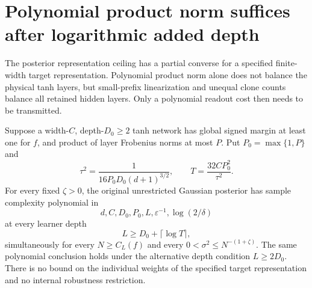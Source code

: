 \section{Polynomial product norm suffices after logarithmic added depth}
\label{sec:product-targets}

The posterior representation ceiling has a partial converse for a
specified finite-width target representation. Polynomial product norm
alone does not balance the physical tanh layers, but small-prefix
linearization and unequal clone counts balance all retained hidden
layers. Only a polynomial readout cost then needs to be transmitted.

\begin{theorem}
\label{thm:product-target-log-padding}
Suppose a width-$C$, depth-$D_0\ge2$ tanh network has global signed
margin at least one for $f$, and product of layer Frobenius norms at
most $P$. Put $P_0=\max\{1,P\}$ and
\[
 \tau^2=\frac1{16P_0D_0(d+1)^{3/2}},\qquad
 T=\frac{32CP_0^2}{\tau^2}.
\]
For every fixed $\zeta>0$, the original unrestricted Gaussian posterior
has sample complexity polynomial in
\[
 d,C,D_0,P_0,L,\varepsilon^{-1},\log(2/\delta)
\]
at every learner depth
\[
 L\ge D_0+\lceil\log T\rceil,
\]
simultaneously for every $N\ge C_L(f)$ and every
$0<\sigma^2\le N^{-(1+\zeta)}$. The same polynomial conclusion holds
under the alternative depth condition $L\ge2D_0$.
There is no bound on the individual weights of the specified target
representation and no internal robustness restriction.
\end{theorem}

